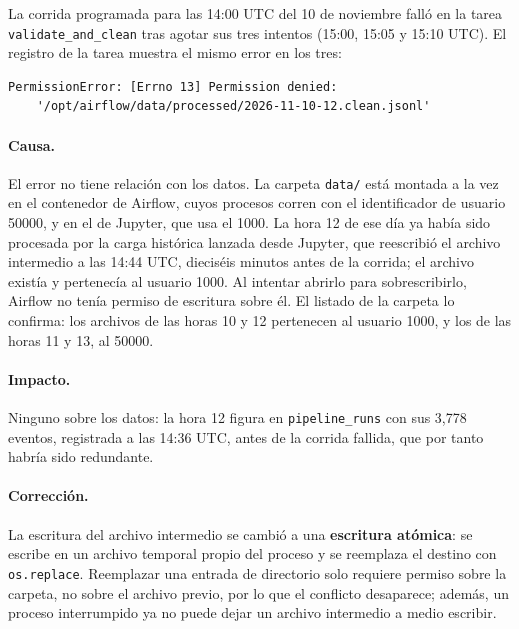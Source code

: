 La corrida programada para las 14:00 UTC del 10 de noviembre falló en la tarea \texttt{validate\_and\_clean} tras agotar sus tres intentos (15:00, 15:05 y 15:10 UTC). El registro de la tarea muestra el mismo error en los tres:

\begin{lstlisting}[style=plano]
PermissionError: [Errno 13] Permission denied:
    '/opt/airflow/data/processed/2026-11-10-12.clean.jsonl'
\end{lstlisting}

\paragraph{Causa.} El error no tiene relación con los datos. La carpeta \texttt{data/} está montada a la vez en el contenedor de Airflow, cuyos procesos corren con el identificador de usuario 50000, y en el de Jupyter, que usa el 1000. La hora 12 de ese día ya había sido procesada por la carga histórica lanzada desde Jupyter, que reescribió el archivo intermedio a las 14:44 UTC, dieciséis minutos antes de la corrida; el archivo existía y pertenecía al usuario 1000. Al intentar abrirlo para sobrescribirlo, Airflow no tenía permiso de escritura sobre él. El listado de la carpeta lo confirma: los archivos de las horas 10 y 12 pertenecen al usuario 1000, y los de las horas 11 y 13, al 50000.

\paragraph{Impacto.} Ninguno sobre los datos: la hora 12 figura en \texttt{pipeline\_runs} con sus 3,778 eventos, registrada a las 14:36 UTC, antes de la corrida fallida, que por tanto habría sido redundante.

\paragraph{Corrección.} La escritura del archivo intermedio se cambió a una \textbf{escritura atómica}: se escribe en un archivo temporal propio del proceso y se reemplaza el destino con \texttt{os.replace}. Reemplazar una entrada de directorio solo requiere permiso sobre la carpeta, no sobre el archivo previo, por lo que el conflicto desaparece; además, un proceso interrumpido ya no puede dejar un archivo intermedio a medio escribir.

